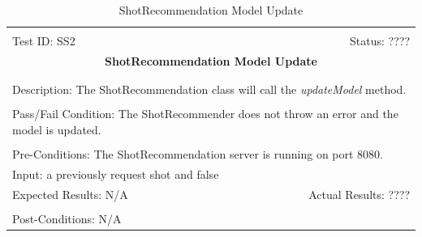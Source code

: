 \documentclass[11pt]{article}
\begin{document}
\begin{center}
\begin{table}[H]
\begin{tabular}{|l r|}\hline&\\[-2mm]
	Test ID: SS2	&Status: ????\\[-3mm]
	\multicolumn{2}{|c|}{\textbf{\large{ShotRecommendation Model Update}}}\\&\\\hline&\\[-3mm]
	\multicolumn{2}{|p{\textwidth}|}{Description: The ShotRecommendation class will call the \textit{updateModel} method.}\\[1mm]\hline&\\[-3mm]
	\multicolumn{2}{|p{\textwidth}|}{Pass/Fail Condition: The ShotRecommender does not throw an error and the model is updated.}\\[1mm]\hline&\\[-3mm]
	\multicolumn{2}{|p{\textwidth}|}{Pre-Conditions: The ShotRecommendation server is running on port 8080.}\\[4mm]
	\multicolumn{2}{|p{\textwidth}|}{Input: a previously request shot and false}\\[2mm]\hline
	\multicolumn{1}{|p{0.49\textwidth}}{Expected Results: N/A}	&\multicolumn{1}{|p{0.45\textwidth}|}{Actual Results: ????}\\\hline&\\[-3mm]
	\multicolumn{2}{|p{\textwidth}|}{Post-Conditions: N/A}\\\hline
\end{tabular}
\caption{ShotRecommendation Model Update}
\end{table}
\end{center}
\end{document}
